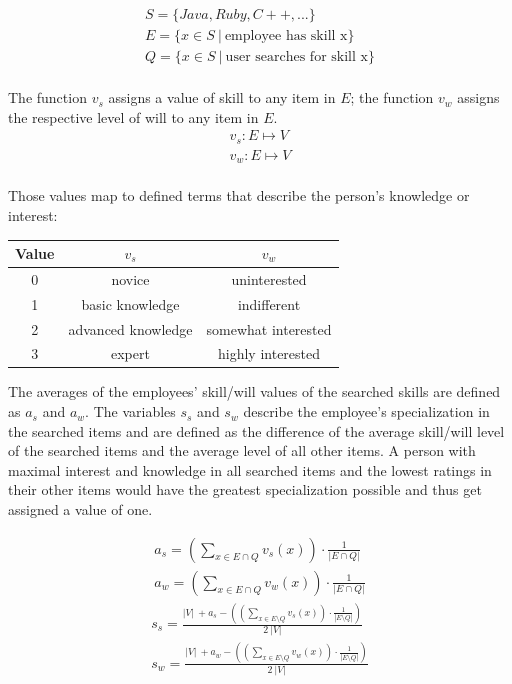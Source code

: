 \begin{gather*}
  S = \{Java, Ruby, C++, ...\} \\
  E = \{x \in S \ | \ \textrm{employee has skill x}\} \\
  Q = \{x \in S \ | \ \textrm{user searches for skill x}\} \\
\end{gather*}

\newpage

The function $v_s$ assigns a value of skill to any item in $E$; the function $v_w$ assigns the respective level of will to any item in $E$.
\begin{gather*}
  v_s: E \mapsto V \\
  v_w: E \mapsto V \\
\end{gather*}

Those values map to defined terms that describe the person's knowledge or interest:
\begin{center}
\begin{tabular}{c|c|c}
	Value & $v_s$ & $v_w$ \\
	\hline
	0 & novice & uninterested\\
	1 & basic knowledge & indifferent\\
	2 & advanced knowledge & somewhat interested\\
	3 & expert & highly interested\\
\end{tabular}
\end{center}

The averages of the employees' skill/will values of the searched skills are defined as $a_s$ and $a_w$.
The variables $s_s$ and $s_w$ describe the employee's specialization in the searched items and are defined as the difference
of the average skill/will level of the searched items and the average level of all other items.
A person with maximal interest and knowledge in all searched items and the lowest ratings in their other items would have the greatest specialization possible and thus get assigned a value of one.

\begin{gather*}
  a_s = \left( \sum_{x \in E \cap Q} v_s(x) \right) \cdot \frac{1}{|E \cap Q|} \\
  a_w = \left( \sum_{x \in E \cap Q} v_w(x) \right) \cdot \frac{1}{|E \cap Q|}
\end{gather*}
\begin{gather*}
  s_s = \frac{|V| \ + a_s - \left( \left( \sum_{x \in E \setminus Q} v_s(x)\right) \cdot \frac{1}{|E \setminus Q|} \right)}{2 \ |V|}\\
  s_w = \frac{|V| \ + a_w - \left( \left( \sum_{x \in E \setminus Q} v_w(x)\right) \cdot \frac{1}{|E \setminus Q|} \right)}{2 \ |V|}
\end{gather*}

